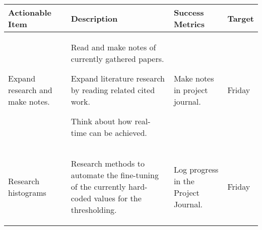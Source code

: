 \pagebreak
\begin{table}[!h]
    \centering
    \begin{tabularx}{\textwidth}{|X|X|X|l|}
        \hline
        Actionable Item & Description & Success Metrics & Target \\
        \hline
        \hline
        Expand research and make notes. &
        \begin{myitemize}
            \item Read and make notes of currently gathered papers.
            \item Expand literature research by reading related cited work.
            \item Think about how real-time can be achieved.
        \end{myitemize} &
        \begin{myitemize}
            \item Make notes in project journal.
        \end{myitemize} &
        Friday \\
        \hline
        Research histograms &
        \begin{myitemize}
            \item Research methods to automate the fine-tuning of the currently hard-coded values for the thresholding.
        \end{myitemize} &
        \begin{myitemize}
            \item Log progress in the Project Journal.
        \end{myitemize} &
        Friday \\
        \hline
    \end{tabularx}
\end{table}
